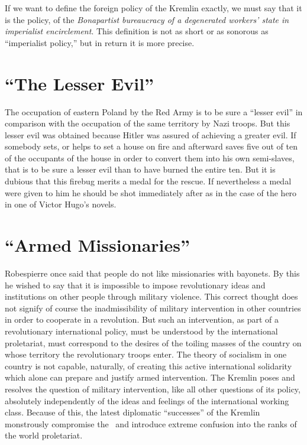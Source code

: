 If we want to define the foreign policy of the Kremlin exactly, we must say that it is the policy, of the \emph{Bonapartist bureaucracy of a degenerated workers’ state in imperialist encirclement}. This definition is not as short or as sonorous as “imperialist policy,” but in return it is more precise.

\section*{“The Lesser Evil”}

The occupation of eastern Poland by the Red Army is to be sure a “lesser evil” in comparison with the occupation of the same territory by Nazi troops. But this lesser evil was obtained because Hitler was assured of achieving a greater evil. If somebody sets, or helps to set a house on fire and afterward saves five out of ten of the occupants of the house in order to convert them into his own semi-slaves, that is to be sure a lesser evil than to have burned the entire ten. But it is dubious that this firebug merits a medal for the rescue. If nevertheless a medal were given to him he should be shot immediately after as in the case of the hero in one of Victor Hugo’s novels.

\section*{“Armed Missionaries”}

Robespierre once said that people do not like missionaries with bayonets. By this he wished to say that it is impossible to impose revolutionary ideas and institutions on other people through military violence. This correct thought does not signify of course the inadmissibility of military intervention in other countries in order to cooperate in a revolution. But such an intervention, as part of a revolutionary international policy, must be understood by the international proletariat, must correspond to the desires of the toiling masses of the country on whose territory the revolutionary troops enter. The theory of socialism in one country is not capable, naturally, of creating this active international solidarity which alone can prepare and justify armed intervention. The Kremlin poses and resolves the question of military intervention, like all other questions of its policy, absolutely independently of the ideas and feelings of the international working class. Because of this, the latest diplomatic “successes” of the Kremlin monstrously compromise the \USSR\ and introduce extreme confusion into the ranks of the world proletariat.

